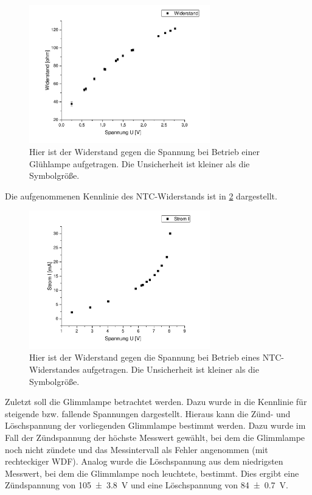 \documentclass[
	a4paper,
	12pt,
	pagesize,
	ngerman
]{scrartcl}
\begin{document}
	\begin{figure}[H]
		\includegraphics[width=0.7\textwidth]{Glueh_Wider}
		\centering
		\caption{Hier ist der Widerstand gegen die Spannung bei Betrieb einer Glühlampe aufgetragen. Die Unsicherheit ist kleiner als die Symbolgröße.}
		\label{Glueh_Wider}
		\centering
	\end{figure}
	Die aufgenommenen Kennlinie des NTC-Widerstands ist in \cref{ntc} dargestellt.
	\begin{figure}[H]
		\includegraphics[width=0.7\textwidth]{ntc}
		\centering
		\caption{Hier ist der Widerstand gegen die Spannung bei Betrieb eines NTC-Widerstandes aufgetragen. Die Unsicherheit ist kleiner als die Symbolgröße.}
		\label{ntc}
		\centering
	\end{figure}
	Zuletzt soll die Glimmlampe betrachtet werden.
	Dazu wurde in  die Kennlinie für steigende bzw. fallende Spannungen dargestellt.
	Hieraus kann die Zünd- und Löschspannung der vorliegenden Glimmlampe bestimmt werden.
	Dazu wurde im Fall der Zündspannung der höchste Messwert gewählt, bei dem die Glimmlampe noch nicht zündete und das Messintervall als Fehler angenommen (mit rechteckiger WDF).
	Analog wurde die Löschspannung aus dem niedrigsten Messwert, bei dem die Glimmlampe noch leuchtete, bestimmt.
	Dies ergibt eine Zündspannung von \SI{105\pm3,8}{V} und eine Löschspannung von \SI{84\pm 0,7}{V}.
	
\end{document}
